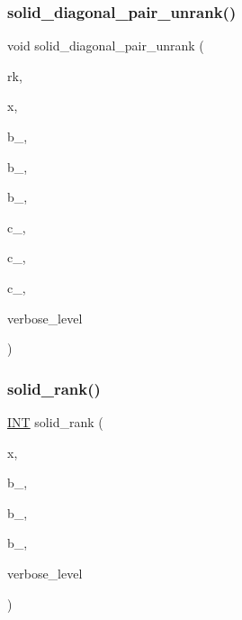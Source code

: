 \subsubsection{\texorpdfstring{solid\+\_\+diagonal\+\_\+pair\+\_\+unrank()}{solid\_diagonal\_pair\_unrank()}}
{\footnotesize\ttfamily void solid\+\_\+diagonal\+\_\+pair\+\_\+unrank (\begin{DoxyParamCaption}\item[{\mbox{\hyperlink{galois_8h_a09fddde158a3a20bd2dcadb609de11dc}{I\+NT}}}]{rk,  }\item[{\mbox{\hyperlink{galois_8h_a09fddde158a3a20bd2dcadb609de11dc}{I\+NT}} $\ast$}]{x,  }\item[{\mbox{\hyperlink{galois_8h_a09fddde158a3a20bd2dcadb609de11dc}{I\+NT}} \&}]{b\+\_,  }\item[{\mbox{\hyperlink{galois_8h_a09fddde158a3a20bd2dcadb609de11dc}{I\+NT}} \&}]{b\+\_,  }\item[{\mbox{\hyperlink{galois_8h_a09fddde158a3a20bd2dcadb609de11dc}{I\+NT}} \&}]{b\+\_,  }\item[{\mbox{\hyperlink{galois_8h_a09fddde158a3a20bd2dcadb609de11dc}{I\+NT}} \&}]{c\+\_,  }\item[{\mbox{\hyperlink{galois_8h_a09fddde158a3a20bd2dcadb609de11dc}{I\+NT}} \&}]{c\+\_,  }\item[{\mbox{\hyperlink{galois_8h_a09fddde158a3a20bd2dcadb609de11dc}{I\+NT}} \&}]{c\+\_,  }\item[{\mbox{\hyperlink{galois_8h_a09fddde158a3a20bd2dcadb609de11dc}{I\+NT}}}]{verbose\+\_\+level }\end{DoxyParamCaption})}

\mbox{\label{hamming_8_c_ab38ee82dcc42663cf6693b24cb65c823}} 
\subsubsection{\texorpdfstring{solid\+\_\+rank()}{solid\_rank()}}
{\footnotesize\ttfamily \mbox{\hyperlink{galois_8h_a09fddde158a3a20bd2dcadb609de11dc}{I\+NT}} solid\+\_\+rank (\begin{DoxyParamCaption}\item[{\mbox{\hyperlink{galois_8h_a09fddde158a3a20bd2dcadb609de11dc}{I\+NT}} $\ast$}]{x,  }\item[{\mbox{\hyperlink{galois_8h_a09fddde158a3a20bd2dcadb609de11dc}{I\+NT}}}]{b\+\_,  }\item[{\mbox{\hyperlink{galois_8h_a09fddde158a3a20bd2dcadb609de11dc}{I\+NT}}}]{b\+\_,  }\item[{\mbox{\hyperlink{galois_8h_a09fddde158a3a20bd2dcadb609de11dc}{I\+NT}}}]{b\+\_,  }\item[{\mbox{\hyperlink{galois_8h_a09fddde158a3a20bd2dcadb609de11dc}{I\+NT}}}]{verbose\+\_\+level }\end{DoxyParamCaption})}

